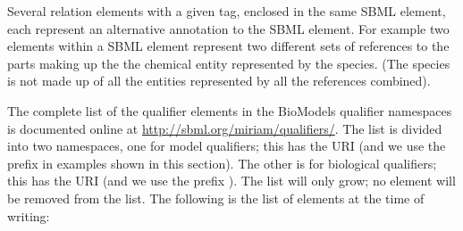 Several relation elements with a given tag, enclosed in the same
SBML element, each represent an alternative annotation to the SBML
element.  For example two  elements within a
\Species SBML element represent two different sets of references
to the parts making up the the chemical entity represented by the
species.  (The species is not made up of all the entities
represented by all the references combined).

The complete list of the qualifier elements in the BioModels
qualifier namespaces is documented online at
\url{http://sbml.org/miriam/qualifiers/}. The list is divided into
two namespaces, one for model qualifiers; this has the URI
 (and we use the
prefix  in examples shown in this section).  The
other is for biological qualifiers; this has the URI
 (and we use the
prefix ).  The list will only grow; \ie no element
will be removed from the list.  The following is the list of
elements at the time of writing:


